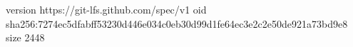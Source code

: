 version https://git-lfs.github.com/spec/v1
oid sha256:7274ec5dfabff53230d446e034c0eb30d99d1fe64ec3e2c2e50de921a73bd9e8
size 2448
